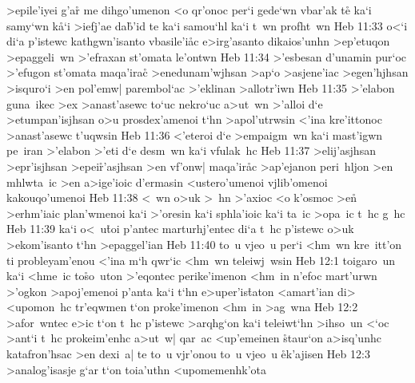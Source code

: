 >epile'iyei
g'ar\r{}
me
dihgo'umenon
<o
qr'onoc
per`i
gede`wn
vbar'ak
te\r{}
ka`i
samy`wn
k\r{a}`i
>iefj'ae
da\r{b}'id
te
ka`i
samou`hl
ka`i
t~wn
profht~wn\bibvsend
\vs Heb 11:33
o<`i
di`a
p'istewc
kathgwn'isanto
vbasile'i\r{a}c
e>irg'asanto
dikaios'unhn
>ep'etuqon
>epaggeli~wn
>'efraxan
st'omata
le'ontwn\bibvsend
\vs Heb 11:34
>'esbesan
d'unamin
pur`oc
>'efugon
st'omata
maqa'irac\r{}
>enedunam'wjhsan
>ap`o
>asjene'iac
>egen'hjhsan
>isquro`i
>en
pol'emw|
parembol`ac
>'eklinan
>allotr'iwn\bibvsend
\vs Heb 11:35
>'elabon
guna~ikec
>ex
>anast'asewc
to`uc
nekro`uc
a>ut~wn
>'alloi
d`e
>etumpan'isjhsan
o>u
prosdex'amenoi
t`hn
>apol'utrwsin
<'ina
kre'ittonoc
>anast'asewc
t'uqwsin\bibvsend
\vs Heb 11:36
<'eteroi
d`e
>empaigm~wn
ka`i
mast'igwn
pe~iran
>'elabon
>'eti
d`e
desm~wn
ka`i
vfulak~hc\bibvsend
\vs Heb 11:37
>elij'asjhsan
>epr'isjhsan
>epei\r{r}'asjhsan
>en
vf'onw|
maqa'ir\r{a}c
>ap'ejanon
peri~hljon
>en
mhlwta~ic
>en
a>ige'ioic
d'ermasin
<ustero'umenoi
vjlib'omenoi
kakouqo'umenoi\bibvsend
\vs Heb 11:38
<~wn
o>uk
>~hn
>'axioc
<o
k'osmoc
>e\r{n}
>erhm'iaic
plan'wmenoi
ka`i
>'oresin
ka`i
sphla'ioic
ka`i
ta~ic
>opa~ic
t~hc
g~hc\bibvsend
\vs Heb 11:39
ka`i
o<~u\r{t}oi
p'antec
marturhj'entec
di`a
t~hc
p'istewc
o>uk
>ekom'isanto
t`hn
>epaggel'ian\bibvsend
\vs Heb 11:40
to~u
vjeo~u
per`i
<hm~wn
kre~itt'on
ti
probleyam'enou
<'ina
m`h
qwr`ic
<hm~wn
teleiwj~wsin\bibvsend
\vs Heb 12:1
toigaro~un
ka`i
<hme~ic
to\r{s}o~uton
>'eqontec
perike'imenon
<hm~in
n'efoc
mart'urwn
>'ogkon
>apoj'emenoi
p'anta
ka`i
t`hn
e>uper'is\r{t}aton
<amart'ian
di>
<upomon~hc
tr'eqwmen
t`on
proke'imenon
<hm~in
>ag~wna\bibvsend
\vs Heb 12:2
>afor~wntec
e>ic
t`on
t~hc
p'istewc
>arqhg`on
ka`i
teleiwt`hn
>ihso~un
<`oc
>ant`i
t~hc
prokeim'enhc
a>ut~w|
qar~ac
<up'emeinen
\r{s}taur`on
a>isq'unhc
katafron'hsac
>en
dexi~a|
te
to~u
vjr'onou
to~u
vjeo~u
\r{e}k'ajisen\bibvsend
{}
\vs Heb 12:3
>analog'isasje
g`ar
t`on
toia'uthn
<upomemenhk'ota
